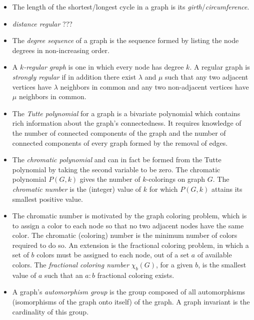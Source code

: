\documentclass[12pt]{article}
\begin{document}
\begin{itemize}
\item The length of the shortest/longest cycle in a graph is its \textit{girth}/\textit{circumference}.
 
\item \textit{distance regular} ???

\item The \textit{degree sequence} of a graph is the sequence formed by listing the node degrees in non-increasing order.  

\item A \textit{$k$-regular graph} is one in which every node has degree $k$. A regular graph is \textit{strongly regular} if in addition there exist $\lambda$ and $\mu$ such that any two adjacent vertices have $\lambda$ neighbors in common and any two non-adjacent vertices have $\mu$ neighbors in common. 

\item The \textit{Tutte polynomial} for a graph is a bivariate polynomial which contains rich information about the graph's connectedness. It requires knowledge of the number of connected components of the graph and the number of connected components of every graph formed by the removal of edges. 

\item The \textit{chromatic polynomial} and can in fact be formed from the Tutte polynomial by taking the second variable to be zero. The chromatic polynomial $P(G,k)$ gives the number of $k$-colorings on graph $G$. The \textit{chromatic number} is the (integer) value of $k$ for which $P(G,k)$ attains its smallest positive value. 

\item The chromatic number is motivated by the graph coloring problem, which is to assign a color to each node so that no two adjacent nodes have the same color. The chromatic (coloring) number is the minimum number of colors required to do so. An extension is the fractional coloring problem, in which a set of $b$ colors must be assigned to each node, out of a set $a$ of available colors. The \textit{fractional coloring number} $\chi_b(G)$, for a given $b$, is the smallest value of $a$ such that an $a:b$ fractional coloring exists. 

\item A graph's \textit{automorphism group} is the group composed of all automorphisms (isomorphisms of the graph onto itself) of the graph. A graph invariant is the cardinality of this group. 


\end{itemize}
\end{document}
